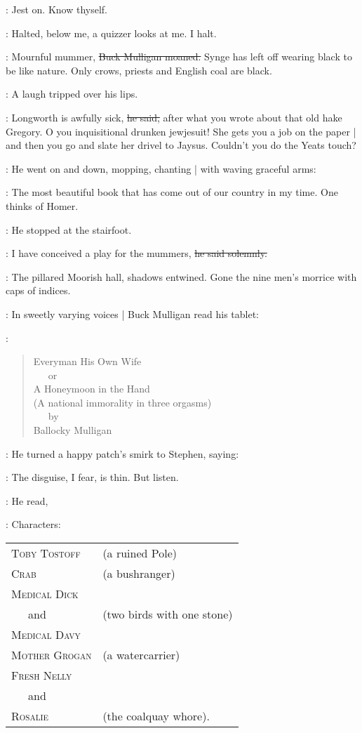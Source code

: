 \StephenInt:
Jest on.
Know thyself.

\StephenInt:
Halted,
below me,
a quizzer looks at me.
I halt.

\mulligan:
Mournful mummer,
\sout{Buck Mulligan moaned.}
Synge has left off wearing black to be like nature.
Only crows, priests and English coal are black.

:
A laugh tripped over his lips.

\mulligan:
Longworth is awfully sick,
\sout{he said,}
after what you wrote about that old hake Gregory.
O you inquisitional drunken jewjesuit!
She gets you a job on the paper |
and then you go and slate her drivel to Jaysus.
Couldn't you do the Yeats touch?

:
He went on and down,
mopping,
chanting |
with waving graceful arms:

\mulligan:
The most beautiful book that has come out of our country in my time.
One thinks of Homer.

:
He stopped at the stairfoot.

\mulligan:
I have conceived a play for the mummers,
\sout{he said solemnly.}

:
The pillared Moorish hall,
shadows entwined.
Gone the nine men's morrice with caps of indices.

:
In sweetly varying voices |
Buck Mulligan read his tablet:

\mulligan:
\begin{verse}
        Everyman His Own Wife \\
          \ \ \ or \\
        A Honeymoon in the Hand \\
    (A national immorality in three orgasms) \\
          \ \ \ by \\
        Ballocky Mulligan
    \end{verse}

:
He turned a happy patch's smirk to Stephen,
saying:

\mulligan:
The disguise,
I fear,
is thin.
But listen.

:
He read,

\mulligan:
Characters:
 \\
\begin{tabular}{lp{10cm}}
    \textsc{Toby Tostoff}    & (a ruined Pole) \\
    \textsc{Crab}            & (a bushranger) \\
    \textsc{Medical Dick}    & \\
        \ \ \ and            & (two birds with one stone) \\
    \textsc{Medical Davy}    & \\
    \textsc{Mother Grogan}   & (a watercarrier) \\
    \textsc{Fresh Nelly} \\
        \ \ \ and \\
    \textsc{Rosalie}        & (the coalquay whore).
\end{tabular}

